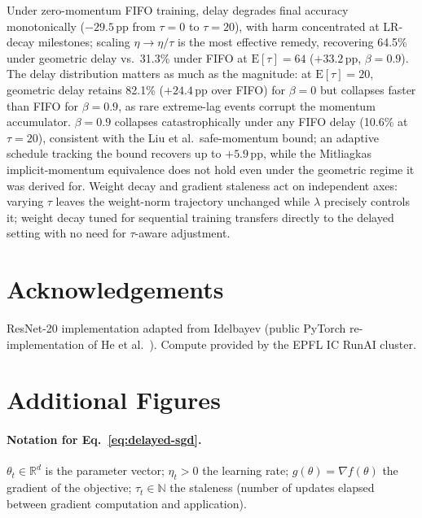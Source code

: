 \documentclass[10pt,conference,compsocconf]{IEEEtran}
\begin{document}
Under zero-momentum FIFO training, delay degrades final accuracy
monotonically ($-29.5$\,pp from $\tau{=}0$ to $\tau{=}20$), with harm
concentrated at LR-decay milestones; scaling $\eta \to \eta/\tau$ is the
most effective remedy, recovering 64.5\% under geometric delay
vs.\ 31.3\% under FIFO at $\mathrm{E}[\tau]{=}64$ ($+33.2$\,pp, $\beta{=}0.9$).
The delay distribution matters as much as the magnitude: at
$\mathrm{E}[\tau]{=}20$, geometric delay retains 82.1\%
($+24.4$\,pp over FIFO) for $\beta{=}0$ but collapses faster than FIFO
for $\beta{=}0.9$, as rare extreme-lag events corrupt the momentum
accumulator.
$\beta{=}0.9$ collapses catastrophically under any FIFO delay
(10.6\% at $\tau{=}20$), consistent with the Liu et al.\
safe-momentum bound; an adaptive schedule tracking the bound recovers
up to $+5.9$\,pp, while the Mitliagkas implicit-momentum equivalence
does not hold even under the geometric regime it was derived for.
Weight decay and gradient staleness act on independent axes: varying $\tau$
leaves the weight-norm trajectory unchanged while $\lambda$ precisely
controls it; weight decay tuned for sequential training transfers directly
to the delayed setting with no need for $\tau$-aware adjustment.

\section*{Acknowledgements}
ResNet-20 implementation adapted from Idelbayev (public PyTorch
re-implementation of He et al.~\cite{he2016resnet}).
Compute provided by the EPFL IC RunAI cluster.

\newpage



\newpage
\appendix
\section{Additional Figures}

\paragraph{Notation for Eq.~\eqref{eq:delayed-sgd}.}
$\theta_t \in \mathbb{R}^d$ is the parameter vector; $\eta_t > 0$ the
learning rate; $g(\theta) = \nabla f(\theta)$ the gradient of the
objective; $\tau_t \in \mathbb{N}$ the staleness (number of updates
elapsed between gradient computation and application).
\end{document}
